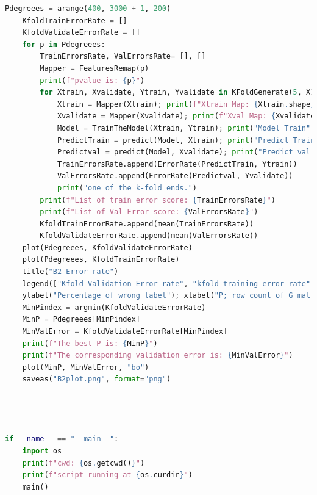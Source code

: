 \documentclass[]{article}
\begin{document}
\begin{lstlisting}[language=python]
	Pdegreees = arange(400, 3000 + 1, 200)
	KfoldTrainErrorRate = []
	KfoldValidateErrorRate = []
	for p in Pdegreees:
		TrainErrorsRate, ValErrorsRate= [], []
		Mapper = FeaturesRemap(p)
		print(f"pvalue is: {p}")
		for Xtrain, Xvalidate, Ytrain, Yvalidate in KFoldGenerate(5, X1, Y1):
			Xtrain = Mapper(Xtrain); print(f"Xtrain Map: {Xtrain.shape}")
			Xvalidate = Mapper(Xvalidate); print(f"Xval Map: {Xvalidate.shape}")
			Model = TrainTheModel(Xtrain, Ytrain); print("Model Train")
			PredictTrain = predict(Model, Xtrain); print("Predict Train Labels")
			Predictval = predict(Model, Xvalidate); print("Predict val labels")
			TrainErrorsRate.append(ErrorRate(PredictTrain, Ytrain))
			ValErrorsRate.append(ErrorRate(Predictval, Yvalidate))
			print("one of the k-fold ends.")
		print(f"List of train error score: {TrainErrorsRate}")
		print(f"List of Val Error score: {ValErrorsRate}")
		KfoldTrainErrorRate.append(mean(TrainErrorsRate))
		KfoldValidateErrorRate.append(mean(ValErrorsRate))
	plot(Pdegreees, KfoldValidateErrorRate)
	plot(Pdegreees, KfoldTrainErrorRate)
	title("B2 Error rate")
	legend(["Kfold Validation Error rate", "kfold training error rate"])
	ylabel("Percentage of wrong label"); xlabel("P; row count of G matrix")
	MinPindex = argmin(KfoldValidateErrorRate)
	MinP = Pdegreees[MinPindex]
	MinValError = KfoldValidateErrorRate[MinPindex]
	print(f"The best P is: {MinP}")
	print(f"The corresponding validation error is: {MinValError}")
	plot(MinP, MinValError, "bo")
	saveas("B2plot.png", format="png")




if __name__ == "__main__":
	import os
	print(f"cwd: {os.getcwd()}")
	print(f"script running at {os.curdir}")
	main()
				
			\end{lstlisting}
		
\end{document}
